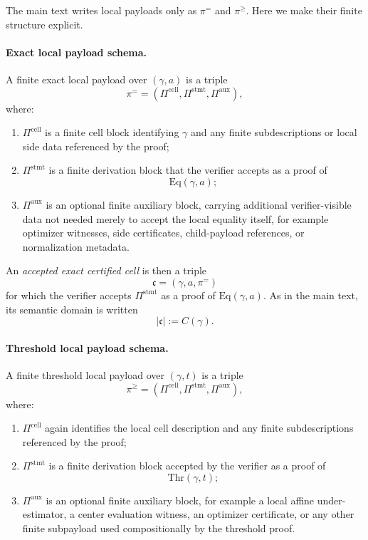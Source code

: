 The main text writes local payloads only as $\pi^{=}$ and $\pi^{\ge}$. Here we make their finite structure explicit.

\paragraph{Exact local payload schema.}
A finite exact local payload over $(\gamma,a)$ is a triple
\[
\pi^{=}
=
(\Pi^{\mathrm{cell}},\Pi^{\mathrm{stmt}},\Pi^{\mathrm{aux}}),
\]
where:
\begin{enumerate}
    \item $\Pi^{\mathrm{cell}}$ is a finite cell block identifying $\gamma$ and any finite subdescriptions or local side data referenced by the proof;
    \item $\Pi^{\mathrm{stmt}}$ is a finite derivation block that the verifier accepts as a proof of
    \[
    \mathrm{Eq}(\gamma,a);
    \]
    \item $\Pi^{\mathrm{aux}}$ is an optional finite auxiliary block, carrying additional verifier-visible data not needed merely to accept the local equality itself, for example optimizer witnesses, side certificates, child-payload references, or normalization metadata.
\end{enumerate}

An \emph{accepted exact certified cell} is then a triple
\[
\mathfrak c=(\gamma,a,\pi^{=})
\]
for which the verifier accepts $\Pi^{\mathrm{stmt}}$ as a proof of $\mathrm{Eq}(\gamma,a)$. As in the main text, its semantic domain is written
\[
|\mathfrak c|:=C(\gamma).
\]

\paragraph{Threshold local payload schema.}
A finite threshold local payload over $(\gamma,t)$ is a triple
\[
\pi^{\ge}
=
(\Pi^{\mathrm{cell}},\Pi^{\mathrm{stmt}},\Pi^{\mathrm{aux}}),
\]
where:
\begin{enumerate}
    \item $\Pi^{\mathrm{cell}}$ again identifies the local cell description and any finite subdescriptions referenced by the proof;
    \item $\Pi^{\mathrm{stmt}}$ is a finite derivation block accepted by the verifier as a proof of
    \[
    \mathrm{Thr}(\gamma,t);
    \]
    \item $\Pi^{\mathrm{aux}}$ is an optional finite auxiliary block, for example a local affine under-estimator, a center evaluation witness, an optimizer certificate, or any other finite subpayload used compositionally by the threshold proof.
\end{enumerate}

